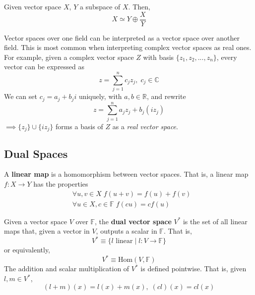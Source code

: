  \begin{proposition}
    Given vector space $X$, $Y$ a subspace of $X$. Then, 
    \begin{equation}
      X \simeq Y \oplus \frac{X}{Y}
    \end{equation}
  \end{proposition}

  Vector spaces over one field can be interpreted as a vector space over another field. This is most common when interpreting complex vector spaces as real ones. For example, given a complex vector space $Z$ with basis $\{z_1, z_2, ..., z_n\}$, every vector can be expressed as
  \begin{equation}
    z = \sum_{j=1}^n c_j z_j, \; c_j \in \mathbb{C}
  \end{equation}
  We can set $c_j = a_j + b_j i$ uniquely, with $a, b \in \mathbb{R}$, and rewrite
  \begin{equation}
    z = \sum_{j=1}^n a_j z_j + b_j (i z_j)
  \end{equation}
  $\implies \{ z_j\} \cup \{ i z_j\}$ forms a basis of $Z$ as a \textit{real vector space}. 

\subsection{Dual Spaces}

  \begin{definition}
    A \textbf{linear map} is a homomorphism between vector spaces. That is, a linear map $f: X \longrightarrow Y$ has the properties 
    \begin{align*}
      & \forall u, v \in X \; f(u + v) = f(u) + f(v) \\
      & \forall u \in X, c \in \mathbb{F} \; f(c u) = c f(u) 
    \end{align*}
  \end{definition}

  \begin{definition}
    Given a vector space $V$ over $\mathbb{F}$, the \textbf{dual vector space} $V^*$ is the set of all linear maps that, given a vector in $V$, outputs a scalar in $\mathbb{F}$. That is, 
    \begin{equation}
      V^* \equiv \{ l \text{ linear} \; | \; l: V \longrightarrow \mathbb{F}\}
    \end{equation}
    or equivalently, 
    \begin{equation}
      V^* \equiv \text{Hom}(V, \mathbb{F})
    \end{equation}
    The addition and scalar multiplication of $V^*$ is defined pointwise. That is, given $l, m \in V^*$, 
    \begin{equation}
      (l + m) (x) = l(x) + m(x), \; (c l)(x) = c l(x)
    \end{equation}
  \end{definition}

